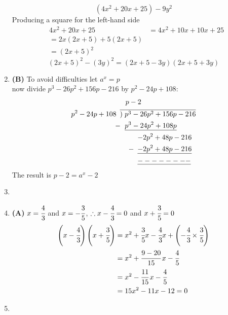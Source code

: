 \begin{multicols}{2}
\begin{enumerate}[label={\textbf{\arabic*.}}]
        \[(4x^2 + 20x + 25) - 9y^2 \]
        Producing a square for the left-hand side
        \begin{align*}
        &4x^2 + 20x + 25 
        &= 4x^2 + 10x + 10x + 25 \\
        &= 2x(2x + 5) + 5(2x + 5) \\
        &= (2x + 5)^2
        \end{align*}
    \[(2x + 5)^2 - (3y)^2 = (2x + 5 - 3y)(2x + 5 + 3y) \] 
\item \textbf{(B)} To avoid difficulties let \( a^x = p \) \\
    now divide \( p^3 - 26p^2 + 156p - 216 \) by \( p^2 - 24p + 108 \):
    \begin{align*} 
        & \hspace{8pt} p - 2 \\
        p^2 - 24p + 108 \hspace{5pt} & \overline{)\hspace{3pt} p^3 - 26p^2 + 156p - 216} \\
       -\hspace{-1pt} & \hspace{7pt} \underline{p^3 - 24p^2 + 108p} \\
       & \hspace{25pt} {-2p^2 + 48p - 216} \\
      -\hspace{-20pt} & \hspace{25pt} \underline{-2p^2 + 48p - 216} \\
      & \hspace{25pt} \underline{--------}
    \end{align*}
    The result is \( p - 2 = a^x - 2 \)
\item
\item \textbf{(A)} \( x = \cfrac{4}{3} \) and \( x = -\cfrac{3}{5} \), \hspace{5pt} \( \therefore  x-\cfrac{4}{3} = 0 \) and \( x+\cfrac{3}{5} = 0 \) 
    \begin{align*}
    \left(x-\cfrac{4}{3}\right)\left(x+\cfrac{3}{5}\right) &= x^2 + \cfrac{3}{5}x - \cfrac{4}{3}x + \left(-\cfrac{4}{3} \times \cfrac{3}{5}\right) \\
    &= x^2  +  \cfrac{9 - 20}{15}\,x -\cfrac{4}{5} \\
    &= x^2 - \cfrac{11}{15}\,x -\cfrac{4}{5} \\
    &= 15x^2 - 11x - 12 = 0
    \end{align*}
\item 
    \begin{align*}

\end{align*}
\end{enumerate}
\end{multicols}
